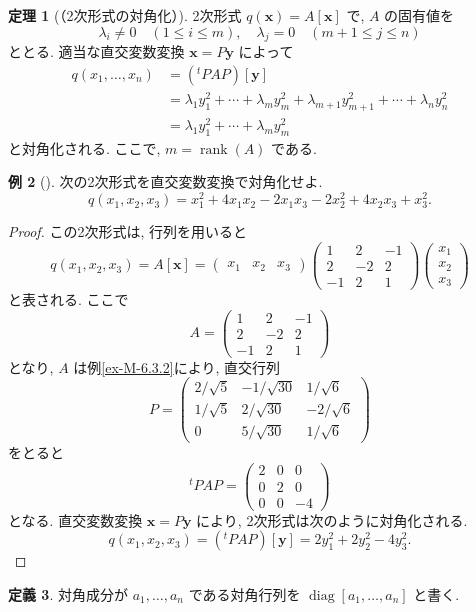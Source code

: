 \documentclass[dvipdfmx,a4paper,11pt]{article} %
\theoremstyle{definition}
\newtheorem{thm}{定理}[section]
\newtheorem{defn}[thm]{定義}
\newtheorem{eg}[thm]{例}
\begin{document}
\begin{thm}
[（2次形式の対角化）{\cite[定理6.4.1]{M}}]
2次形式 $q(\bm{x})=A[\bm{x}]$ で, $A$ の固有値を
\[
\lambda_i\neq0\quad(1\leq i\leq m),
\quad
\lambda_j=0\quad(m+1\leq j\leq n)
\]
ととる. 適当な直交変数変換 $\bm{x}=P\bm{y}$ によって
\[
\begin{aligned}
q(x_1,\ldots,x_n)
&=({}^{t}\!PAP)[\bm{y}]\\
&=\lambda_1y_1^2+\cdots+\lambda_my_m^2
+\lambda_{m+1}y_{m+1}^2+\cdots+\lambda_ny_n^2\\
&=\lambda_1y_1^2+\cdots+\lambda_my_m^2
\end{aligned}
\]
と対角化される. ここで,
\(
m=\operatorname{rank}(A)
\)
である.
\end{thm}

\begin{eg}
[{\cite[例題6.4.1]{M}}]
次の2次形式を直交変数変換で対角化せよ.
\[
q(x_1,x_2,x_3)
=
x_1^2+4x_1x_2-2x_1x_3-2x_2^2+4x_2x_3+x_3^2.
\]
\end{eg}

\begin{proof}
この2次形式は, 行列を用いると
\[
q(x_1,x_2,x_3)
=
A[\bm{x}]
=
\begin{pmatrix}
x_1& x_2& x_3
\end{pmatrix}
\begin{pmatrix}
1&2&-1\\
2&-2&2\\
-1&2&1
\end{pmatrix}
\begin{pmatrix}
x_1\\
x_2\\
x_3
\end{pmatrix}
\]
と表される. ここで
\[
A=
\begin{pmatrix}
1&2&-1\\
2&-2&2\\
-1&2&1
\end{pmatrix}
\]
となり, $A$ は例\ref{ex-M-6.3.2}により, 直交行列
\[
P=
\begin{pmatrix}
2/\sqrt{5}&-1/\sqrt{30}&1/\sqrt{6}\\
1/\sqrt{5}&2/\sqrt{30}&-2/\sqrt{6}\\
0&5/\sqrt{30}&1/\sqrt{6}
\end{pmatrix}
\]
をとると
\[
{}^{t}\!PAP=
\begin{pmatrix}
2&0&0\\
0&2&0\\
0&0&-4
\end{pmatrix}
\]
となる. 直交変数変換 $\bm{x}=P\bm{y}$ により, 2次形式は次のように対角化される.
\[
q(x_1,x_2,x_3)
=
({}^{t}\!PAP)[\bm{y}]
=
2y_1^2+2y_2^2-4y_3^2.
\]
\end{proof}
\begin{defn}
対角成分が $a_1,\ldots,a_n$ である対角行列を
\(
\operatorname{diag}[a_1,\ldots,a_n]
\)
と書く.
\end{defn}
\end{document}
